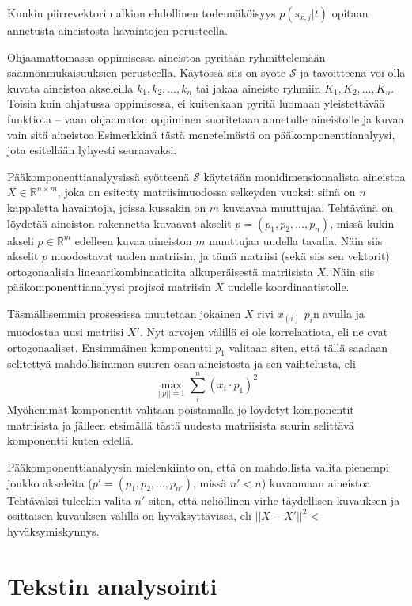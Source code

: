 \documentclass[finnish,gradu,twoside,12pt]{tktltiki}
\begin{document}
{Kunkin piirrevektorin alkion ehdollinen todennäköisyys $p( s_{x,j} | t)$ opitaan annetusta aineistosta havaintojen perusteella.

Ohjaamattomassa oppimisessa aineistoa pyritään ryhmittelemään säännönmukaisuuksien perusteella. Käytössä siis on syöte $\mathcal{S}$ ja tavoitteena voi olla kuvata aineistoa akseleilla $k_1, k_2, \ldots , k_n$ tai jakaa aineisto ryhmiin $K_1, K_2, \ldots, K_n$. Toisin kuin ohjatussa oppimisessa, ei kuitenkaan pyritä luomaan yleistettävää funktiota -- vaan ohjaamaton oppiminen suoritetaan annetulle aineistolle ja kuvaa vain sitä aineistoa.Esimerkkinä tästä menetelmästä on pääkomponenttianalyysi, jota esitellään lyhyesti seuraavaksi.

Pääkomponenttianalyysissä syötteenä $\mathcal{S}$ käytetään monidimensionaalista aineistoa $X \in \mathbb{R}^{ n \times m}$, joka on esitetty matriisimuodossa selkeyden vuoksi: siinä on $n$ kappaletta havaintoja, joissa kussakin on $m$ kuvaavaa muuttujaa. Tehtävänä on löydetää aineiston rakennetta kuvaavat akselit $p = ( p_1, p_2, \ldots, p_n )$, missä kukin akseli $p \in \mathbb{R}^m$ edelleen kuvaa aineiston $m$  muuttujaa uudella tavalla. Näin siis akselit $p$ muodostavat uuden matriisin, ja tämä matriisi (sekä siis sen vektorit) ortogonaalisia lineaarikombinaatioita alkuperäisestä matriisista $X$. Näin siis pääkomponenttianalyysi projisoi matriisin $X$ uudelle koordinaatistolle.

Täsmällisemmin prosessissa muutetaan jokainen $X$ rivi $x_{(i)}$ $p_i$n avulla ja muodostaa uusi matriisi $X'$. Nyt arvojen välillä ei ole korrelaatiota, eli ne ovat ortogonaaliset. Ensimmäinen komponentti $p_1$ valitaan siten, että tällä saadaan selitettyä mahdollisimman suuren osan aineistosta ja sen vaihtelusta, eli $$\max_{||p||=1} \sum_i^n (x_i \cdot p_1 )^2$$ Myöhemmät komponentit valitaan poistamalla jo löydetyt komponentit matriisista ja jälleen etsimällä tästä uudesta matriisista suurin selittävä  komponentti kuten edellä.

Pääkomponenttianalyysin mielenkiinto on, että on mahdollista valita pienempi joukko akseleita ($p' = (p_1, p_2, \ldots, p_{n'})$, missä $n' < n$) kuvaamaan aineistoa. Tehtäväksi tuleekin valita $n'$ siten, että neliöllinen virhe täydellisen kuvauksen ja osittaisen kuvauksen välillä on hyväksyttävissä, eli $||X-X'||^2 < $ hyväksymiskynnys.

\section{Tekstin analysointi}
\label{sec:textanalysis}

}
\end{document}
